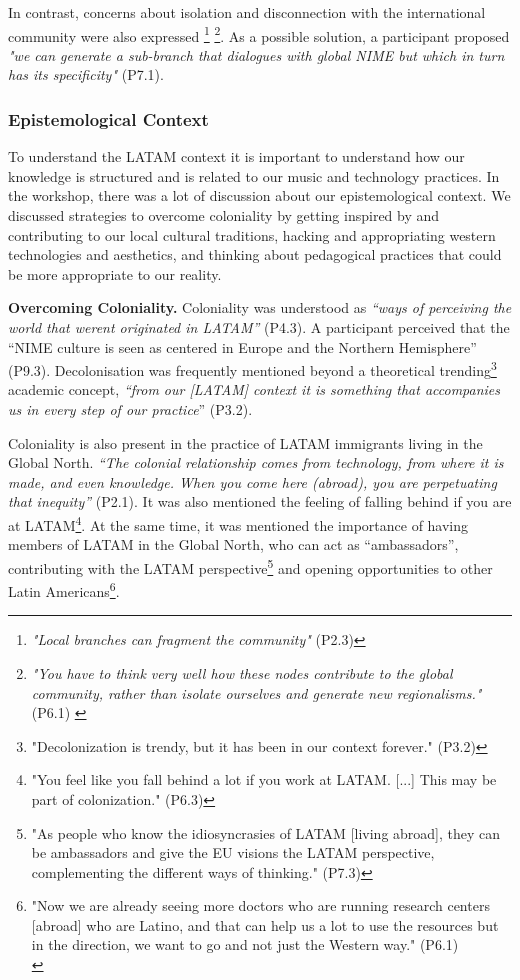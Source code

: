 \documentclass[sigconf]{nimeart}
\begin{document}
In contrast, concerns about isolation and disconnection with the international community were also expressed \footnote{\emph{"Local branches can fragment the community"} (P2.3)} \footnote{\emph{"You have to think very well how these nodes contribute to the global community, rather than isolate ourselves and generate new regionalisms."} (P6.1) \emph{}}. As a possible solution, a participant proposed \emph{"we can generate a sub-branch that dialogues with global NIME but which in turn has its specificity"} (P7.1).

\subsubsection{Epistemological Context}\label{epistemological-context}

To understand the LATAM context it is important to understand how our knowledge is structured and is related to our music and technology practices. In the workshop, there was a lot of discussion about our epistemological context. We discussed strategies to overcome coloniality by getting inspired by and contributing to our local cultural traditions, hacking and appropriating western technologies and aesthetics, and thinking about pedagogical practices that could be more appropriate to our reality.

\textbf{Overcoming Coloniality.} Coloniality was understood as \emph{``ways of perceiving the world that weren\textquotesingle t originated in LATAM''} (P4.3). A participant perceived that the ``NIME culture is seen as centered in Europe and the Northern Hemisphere'' (P9.3). Decolonisation was frequently mentioned beyond a theoretical trending\footnote{"Decolonization is trendy, but it has been in our context forever." (P3.2)} academic concept, \emph{``from our {[}LATAM{]} context it is something that accompanies us in every step of our practice}'' (P3.2).

Coloniality is also present in the practice of LATAM immigrants living in the Global North. \emph{``The colonial relationship comes from technology, from where it is made, and even knowledge. When you come here (abroad), you are perpetuating that inequity''} (P2.1). It was also mentioned the feeling of falling behind if you are at LATAM\footnote{"You feel like you fall behind a lot if you work at LATAM. {[}...{]} This may be part of colonization." (P6.3)}. At the same time, it was mentioned the importance of having members of LATAM in the Global North, who can act as ``ambassadors'', contributing with the LATAM perspective\footnote{"As people who know the idiosyncrasies of LATAM {[}living abroad{]}, they can be ambassadors and give the EU visions the LATAM perspective, complementing the different ways of thinking." (P7.3)} and opening opportunities to other Latin Americans\footnote{"Now we are already seeing more doctors who are running research centers {[}abroad{]} who are Latino, and that can help us a lot to use the resources but in the direction, we want to go and not just the Western way." (P6.1)\\}.
\end{document}
